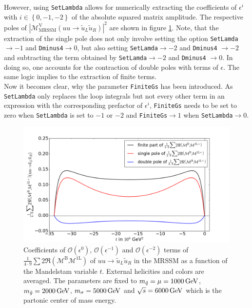 However, using \texttt{SetLambda} allows for numerically extracting the coefficients of $\epsilon^i$ with $i \in \left\{ 0,-1,-2 \right\}$ of the absolute squared matrix amplitude. The respective poles of $|\mathcal{M}^{\mathrm{V}}_{\mathrm{MRSSM}}(uu \to \tilde{u}_L\tilde{u}_R)|^2$ are shown in figure \ref{fig:MatrixElementPoles}. Note, that the extraction of the single pole does not only involve setting the option \texttt{SetLamda} $\to-1$ and \texttt{Dminus4}$\to 0$, but also setting \texttt{SetLamda}$\to -2$ and \texttt{Dminus4} $\to -2$ and subtracting the term obtained by \texttt{SetLamda}$\to-2$ and \texttt{Dminus4} $\to 0$. In doing so, one accounts for the contraction of double poles with terms of $\mathcal{\epsilon}$. The same logic implies to the extraction of finite terms.\\
Now it becomes clear, why the parameter \texttt{FiniteGs} has been introduced. As \texttt{SetLambda} only replaces the loop integrals but not every other term in an expression with the corresponding prefactor of $\epsilon^i$, \texttt{FiniteGs} needs to be set to zero when \texttt{SetLambda} is set to $-1$ or $-2$ and \texttt{FiniteGs}$\to 1$ when \texttt{SetLambda}$\to 0$.
\begin{figure}[H]
\begin{center}
\includegraphics[scale=.5]{figures/MatrixElement_Poles.png}
\caption{Coefficients of $\mathcal{O}(\epsilon^0)$, $\mathcal{O}(\epsilon^{-1})$ and $\mathcal{O}(\epsilon^{-2})$ terms of $\frac{1}{4\cdot 9}\sum 2 \Re (\mathcal{M}^{\mathrm{B}}\mathcal{M}^{\mathrm{1L}})$ of $uu \to \tilde{u}_L\tilde{u}_R$ in the MRSSM as a function of the Mandelstam variable $t$. External helicities and colors are averaged. The parameters are fixed to $m_{\tilde{q}} = \mu = \unit[1000]{GeV}$, $m_{\tilde{g}} = \unit[2000]{GeV}$, $m_{\sigma} = \unit[5000]{GeV}$ and $\sqrt{s} = \unit[6000]{GeV}$ which is the partonic center of mass energy.}\label{fig:MatrixElementPoles}
\end{center}
\end{figure}
